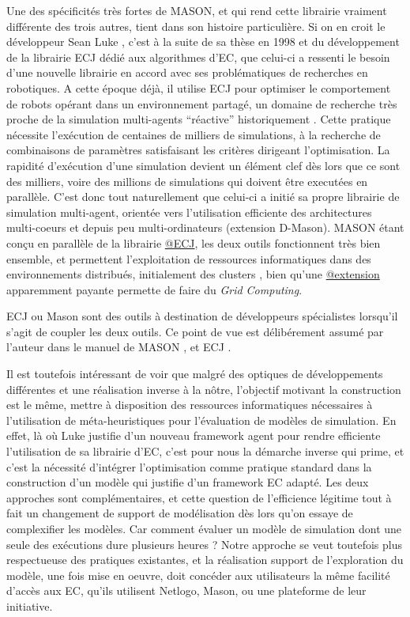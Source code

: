 Une des spécificités très fortes de MASON, et qui rend cette librairie vraiment différente des trois autres, tient dans son histoire particulière. Si on en croit le développeur Sean Luke , c'est à la suite de sa thèse en 1998 et du développement de la librairie ECJ  dédié aux algorithmes d'EC, que celui-ci a ressenti le besoin d'une nouvelle librairie en accord avec ses problématiques de recherches en robotiques. A cette époque déjà, il utilise ECJ pour optimiser le comportement de robots opérant dans un environnement partagé, un domaine de recherche très proche de la simulation multi-agents \enquote{réactive} historiquement \autocites{Brooks1991, Steels, Ferber}. Cette pratique nécessite l'exécution de centaines de milliers de simulations, à la recherche de combinaisons de paramètres satisfaisant les critères dirigeant l'optimisation. La rapidité d'exécution d'une simulation devient un élément clef dès lors que ce sont des milliers, voire des millions de simulations qui doivent être executées en parallèle. C'est donc tout naturellement que celui-ci a initié sa propre librairie de simulation multi-agent, orientée vers l'utilisation efficiente des architectures multi-coeurs et depuis peu multi-ordinateurs (extension D-Mason). MASON étant conçu en parallèle de la librairie \href{http://cs.gmu.edu/~eclab/projects/ecj/}{@ECJ}, les deux outils fonctionnent très bien ensemble, et permettent l'exploitation de ressources informatiques dans des environnements distribués, initialement des clusters \autocite[211]{Luke2014}, bien qu'une \href{http://www.parabon.com/dev-center/origin}{@extension} apparemment payante permette de faire du \textit{Grid Computing}.

ECJ ou Mason sont des outils à destination de développeurs spécialistes lorsqu'il s'agit de coupler les deux outils. Ce point de vue est délibérement assumé par l'auteur dans le manuel de MASON , et ECJ .

Il est toutefois intéressant de voir que malgré des optiques de développements différentes et une réalisation inverse à la nôtre, l'objectif motivant la construction est le même, mettre à disposition des ressources informatiques nécessaires à l'utilisation de méta-heuristiques pour l'évaluation de modèles de simulation. En effet, là où Luke justifie d'un nouveau framework agent pour rendre efficiente l'utilisation de sa librairie d'EC, c'est pour nous la démarche inverse qui prime, et c'est la nécessité d'intégrer l'optimisation comme pratique standard dans la construction d'un modèle qui justifie d'un framework EC adapté. Les deux approches sont complémentaires, et cette question de l'efficience légitime tout à fait un changement de support de modélisation dès lors qu'on essaye de complexifier les modèles. Car comment évaluer un modèle de simulation dont une seule des exécutions dure plusieurs heures ? Notre approche se veut toutefois plus respectueuse des pratiques existantes, et la réalisation support de l'exploration du modèle, une fois mise en oeuvre, doit concéder aux utilisateurs la même facilité d'accès aux EC, qu'ils utilisent Netlogo, Mason, ou une plateforme de leur initiative.

